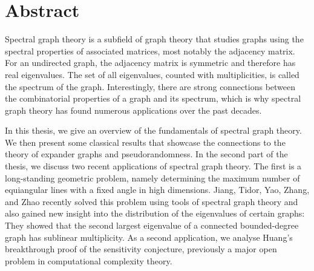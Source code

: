 \chapter*{Abstract}

Spectral graph theory is a subfield of graph theory that studies graphs using the spectral properties of associated matrices, most notably the adjacency matrix.
For an undirected graph, the adjacency matrix is symmetric and therefore has real eigenvalues. 
The set of all eigenvalues, counted with multiplicities, is called the spectrum of the graph.
Interestingly, there are strong connections between the combinatorial properties of a graph and its spectrum, which is why spectral graph theory has found numerous applications over the past decades.

In this thesis, we give an overview of the fundamentals of spectral graph theory. 
We then present some classical results that showcase the connections to the theory of expander graphs and pseudorandomness.
In the second part of the thesis, we discuss two recent applications of spectral graph theory.
The first is a long-standing geometric problem, namely determining the maximum number of equiangular lines with a fixed angle in high dimensions. 
Jiang, Tidor, Yao, Zhang, and Zhao recently solved this problem using tools of spectral graph theory and also gained new insight into the distribution of the eigenvalues of certain graphs: They showed that the second largest eigenvalue of a connected bounded-degree graph has sublinear multiplicity.
As a second application, we analyse Huang's breakthrough proof of the sensitivity conjecture, previously a major open problem in computational complexity theory.

\bigskip
{}

